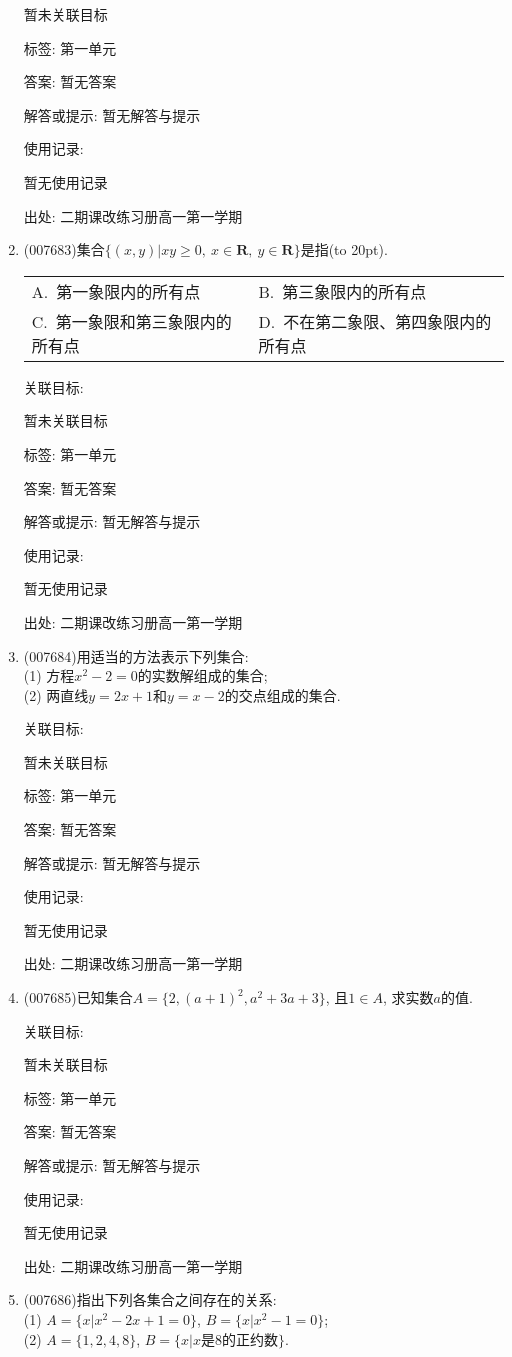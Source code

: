 \documentclass[10pt,a4paper]{article}
\newcommand{\bracket}[1]{(\hbox to #1pt{})}
\newcommand{\twoch}[4]{\par\begin{tabular}{p{.46\textwidth}p{.46\textwidth}}
A.~#1& B.~#2\\
C.~#3& D.~#4
\end{tabular}}
\begin{document}
\begin{enumerate}[1.]
暂未关联目标



标签: 第一单元

答案: 暂无答案

解答或提示: 暂无解答与提示

使用记录:

暂无使用记录


出处: 二期课改练习册高一第一学期
\item { (007683)}集合$\{(x,y)|xy\ge 0, \ x\in \mathbf{R}, \ y\in \mathbf{R}\}$是指\bracket{20}.
\twoch{第一象限内的所有点}{第三象限内的所有点}{第一象限和第三象限内的所有点}{不在第二象限、第四象限内的所有点}


关联目标:

暂未关联目标



标签: 第一单元

答案: 暂无答案

解答或提示: 暂无解答与提示

使用记录:

暂无使用记录


出处: 二期课改练习册高一第一学期
\item { (007684)}用适当的方法表示下列集合:\\
(1) 方程$x^2-2=0$的实数解组成的集合;\\
(2) 两直线$y=2x+1$和$y=x-2$的交点组成的集合.


关联目标:

暂未关联目标



标签: 第一单元

答案: 暂无答案

解答或提示: 暂无解答与提示

使用记录:

暂无使用记录


出处: 二期课改练习册高一第一学期
\item { (007685)}已知集合$A=\{2,(a+1)^2,a^2+3a+3\}$, 且$1\in A$, 求实数$a$的值.


关联目标:

暂未关联目标



标签: 第一单元

答案: 暂无答案

解答或提示: 暂无解答与提示

使用记录:

暂无使用记录


出处: 二期课改练习册高一第一学期
\item { (007686)}指出下列各集合之间存在的关系:\\
(1) $A=\{x|x^2-2x+1=0\}$, $B=\{x|x^2-1=0\}$;\\
(2) $A=\{1,2,4,8\}$, $B=\{x|x\text{是}8\text{的正约数}\}$.



\end{enumerate}
\end{document}
